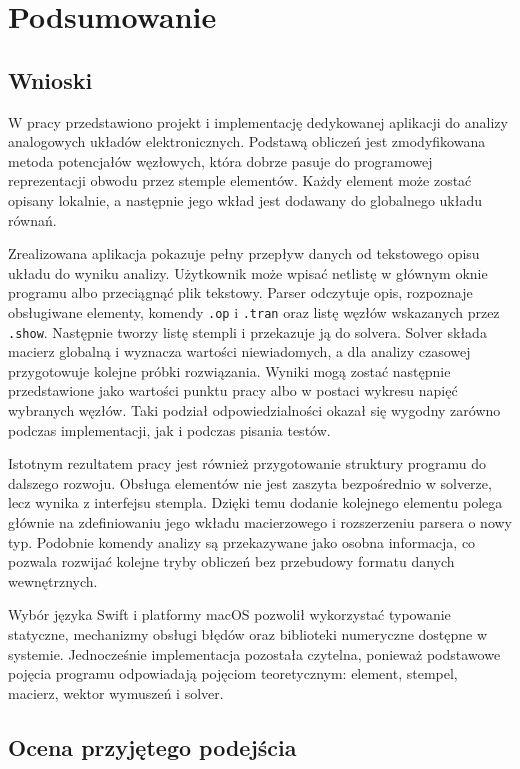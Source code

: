 \chapter{Podsumowanie}
\label{chap:podsumowanie}

\section{Wnioski}
\label{sec:wnioski}

W pracy przedstawiono projekt i implementację dedykowanej aplikacji do analizy analogowych układów elektronicznych. Podstawą obliczeń jest zmodyfikowana metoda potencjałów węzłowych, która dobrze pasuje do programowej reprezentacji obwodu przez stemple elementów. Każdy element może zostać opisany lokalnie, a następnie jego wkład jest dodawany do globalnego układu równań.

Zrealizowana aplikacja pokazuje pełny przepływ danych od tekstowego opisu układu do wyniku analizy. Użytkownik może wpisać netlistę w głównym oknie programu albo przeciągnąć plik tekstowy. Parser odczytuje opis, rozpoznaje obsługiwane elementy, komendy \texttt{.op} i \texttt{.tran} oraz listę węzłów wskazanych przez \texttt{.show}. Następnie tworzy listę stempli i przekazuje ją do solvera. Solver składa macierz globalną i wyznacza wartości niewiadomych, a dla analizy czasowej przygotowuje kolejne próbki rozwiązania. Wyniki mogą zostać następnie przedstawione jako wartości punktu pracy albo w postaci wykresu napięć wybranych węzłów. Taki podział odpowiedzialności okazał się wygodny zarówno podczas implementacji, jak i podczas pisania testów.

Istotnym rezultatem pracy jest również przygotowanie struktury programu do dalszego rozwoju. Obsługa elementów nie jest zaszyta bezpośrednio w solverze, lecz wynika z interfejsu stempla. Dzięki temu dodanie kolejnego elementu polega głównie na zdefiniowaniu jego wkładu macierzowego i rozszerzeniu parsera o nowy typ. Podobnie komendy analizy są przekazywane jako osobna informacja, co pozwala rozwijać kolejne tryby obliczeń bez przebudowy formatu danych wewnętrznych.

Wybór języka Swift i platformy macOS pozwolił wykorzystać typowanie statyczne, mechanizmy obsługi błędów oraz biblioteki numeryczne dostępne w systemie. Jednocześnie implementacja pozostała czytelna, ponieważ podstawowe pojęcia programu odpowiadają pojęciom teoretycznym: element, stempel, macierz, wektor wymuszeń i solver.

\section{Ocena przyjętego podejścia}
\label{sec:ocena-podejscia}

